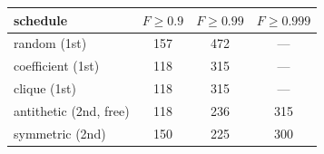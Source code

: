 \begin{tabular}{lccc}
\toprule
schedule & $F\!\geq\!0.9$ & $F\!\geq\!0.99$ & $F\!\geq\!0.999$ \\
\midrule
random (1st) & 157 & 472 & --- \\
coefficient (1st) & 118 & 315 & --- \\
clique (1st) & 118 & 315 & --- \\
antithetic (2nd, free) & 118 & 236 & 315 \\
symmetric (2nd) & 150 & 225 & 300 \\
\bottomrule
\end{tabular}
